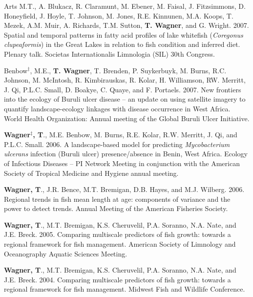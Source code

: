 \documentclass[10pt]{article}
\begin{document}
\begin{flushleft}
\begin{etaremune}
\item Arts M.T., A. Blukacz, R. Claramunt, M. Ebener, M. Faisal, J. Fitzsimmons, D. Honeyfield, J. Hoyle, T. Johnson, M. Jones, R.E. Kinnunen, M.A. Koops, T. Mezek, A.M. Muir, A. Richards, T.M. Sutton, {\bf T. Wagner}, and G. Wright. 2007. Spatial and temporal patterns in fatty acid profiles of lake whitefish (\emph{Coregonus clupeaformis}) in the Great Lakes in relation to fish condition and inferred diet. Plenary talk. Societas Internationalis Limnologia (SIL) 30th Congress. 

\item Benbow$^\ddagger$, M.E., {\bf T. Wagner}, T. Brenden, P. Suykerbuyk, M. Burns, R.C. Johnson, M. McIntosh, R. Kimbirauskas, R. Kolar, H. Williamson, RW. Merritt, J. Qi, P.L.C. Small, D. Boakye, C. Quaye, and F. Portaels. 2007. New frontiers into the ecology of Buruli ulcer disease – an update on using satellite imagery to quantify landscape-ecology linkages with disease occurrence in West Africa. World Health Organization: Annual meeting of the Global Buruli Ulcer Initiative.


\item {\bf Wagner$^\ddagger$, T}., M.E. Benbow, M. Burns, R.E. Kolar, R.W. Merritt, J. Qi, and P.L.C. Small. 2006. A landscape-based model for predicting \emph{Mycobacterium ulcerans} infection (Buruli ulcer) presence/absence in Benin, West Africa. Ecology of Infectious Diseases – PI Network Meeting in conjunction with the American Society of Tropical Medicine and Hygiene annual meeting. 

\item {\bf Wagner, T}., J.R. Bence, M.T. Bremigan, D.B. Hayes, and M.J. Wilberg. 2006. Regional trends in fish mean length at age: components of variance and the power to detect trends. Annual Meeting of the American Fisheries Society. 


\item {\bf Wagner, T}., M.T. Bremigan, K.S. Cheruvelil, P.A. Soranno, N.A. Nate, and J.E. Breck. 2005. Comparing multiscale predictors of fish growth: towards a regional framework for fish management. American Society of Limnology and Oceanography Aquatic Sciences Meeting. 


\item {\bf Wagner, T}., M.T. Bremigan, K.S. Cheruvelil, P.A. Soranno, N.A. Nate, and J.E. Breck. 2004. Comparing multiscale predictors of fish growth: towards a regional framework for fish management. Midwest Fish and Wildlife Conference.


\end{etaremune}
\end{flushleft}
\end{document}
